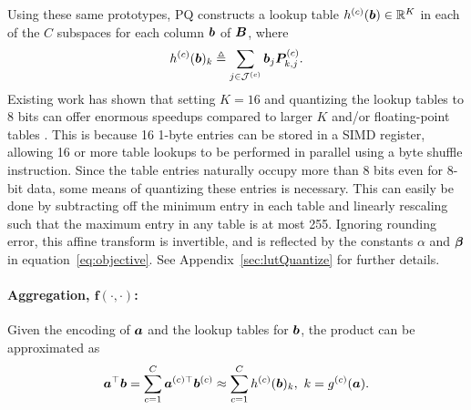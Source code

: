 Using these same prototypes, PQ constructs a lookup table $h^{(c)}(\bm{b}) \in \mathbb{R}^K$ in each of the $C$ subspaces for each column $\bm{b}$ of $\bm{B}$, where
\begin{align}
    h^{(c)}(\bm{b})_k \triangleq \sum_{j\in \mathcal{J}^{(c)}} \bm{b}_j \bm{P}^{(c)}_{k,j}.
\end{align}
Existing work has shown that setting $K = 16$ and quantizing the lookup tables to 8 bits can offer enormous speedups compared to larger $K$ and/or floating-point tables \cite{bolt, quickAdc, quickerAdc}. This is because 16 1-byte entries can be stored in a SIMD register, allowing 16 or more table lookups to be performed in parallel using a byte shuffle instruction. Since the table entries naturally occupy more than 8 bits even for 8-bit data, some means of quantizing these entries is necessary. This can easily be done by subtracting off the minimum entry in each table and linearly rescaling such that the maximum entry in any table is at most 255. Ignoring rounding error, this affine transform is invertible, and is reflected by the constants $\alpha$ and $\bm{\beta}$ in equation~\ref{eq:objective}. See Appendix~\ref{sec:lutQuantize} for further details.


\vspace{-2mm}
\paragraph{Aggregation, $\bm{f(\cdot,\cdot)}$:}

Given the encoding of $\bm{a}$ and the lookup tables for $\bm{b}$, the product can be approximated as
\vspace*{-2mm}
\begin{align}
    \bm{a}^\top \bm{b} = \sum_{c=1}^C \bm{a}^{(c)\top} \bm{b}^{(c)} \approx \sum_{c=1}^C h^{(c)}(\bm{b})_k, \text{ }k = g^{(c)}(\bm{a}).
\end{align}

